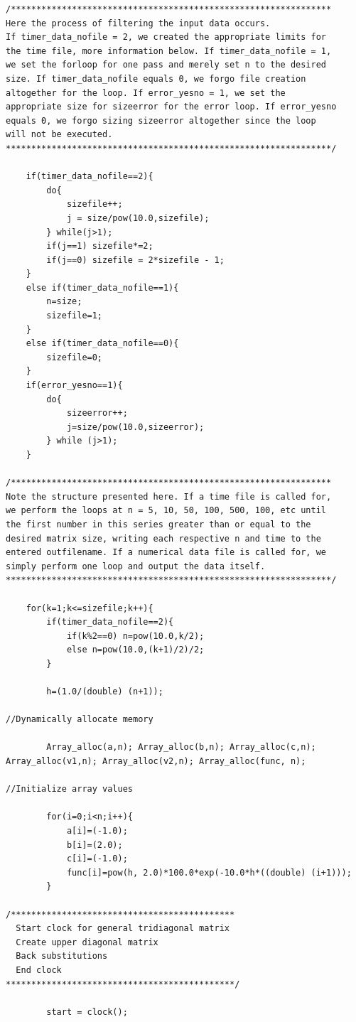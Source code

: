 \documentclass[11pt,a4paper]{article}
\begin{document}
\begin{lstlisting}[title={tridiag.cpp}]
/***************************************************************
Here the process of filtering the input data occurs.
If timer_data_nofile = 2, we created the appropriate limits for
the time file, more information below. If timer_data_nofile = 1, 
we set the forloop for one pass and merely set n to the desired 
size. If timer_data_nofile equals 0, we forgo file creation 
altogether for the loop. If error_yesno = 1, we set the 
appropriate size for sizeerror for the error loop. If error_yesno
equals 0, we forgo sizing sizeerror altogether since the loop 
will not be executed.
****************************************************************/
	
	if(timer_data_nofile==2){
		do{
			sizefile++;
			j = size/pow(10.0,sizefile);
		} while(j>1);
		if(j==1) sizefile*=2;
		if(j==0) sizefile = 2*sizefile - 1;
	}
	else if(timer_data_nofile==1){
		n=size;
		sizefile=1;
	}
	else if(timer_data_nofile==0){
		sizefile=0;
	}
	if(error_yesno==1){
		do{
			sizeerror++;
			j=size/pow(10.0,sizeerror);
		} while (j>1);
	}

/***************************************************************
Note the structure presented here. If a time file is called for, 
we perform the loops at n = 5, 10, 50, 100, 500, 100, etc until 
the first number in this series greater than or equal to the 
desired matrix size, writing each respective n and time to the
entered outfilename. If a numerical data file is called for, we
simply perform one loop and output the data itself.
****************************************************************/

	for(k=1;k<=sizefile;k++){
		if(timer_data_nofile==2){
			if(k%2==0) n=pow(10.0,k/2);
			else n=pow(10.0,(k+1)/2)/2;
		}
	
		h=(1.0/(double) (n+1));

//Dynamically allocate memory
	
		Array_alloc(a,n); Array_alloc(b,n); Array_alloc(c,n); Array_alloc(v1,n); Array_alloc(v2,n); Array_alloc(func, n);

//Initialize array values

		for(i=0;i<n;i++){
			a[i]=(-1.0);
			b[i]=(2.0);
			c[i]=(-1.0);
			func[i]=pow(h, 2.0)*100.0*exp(-10.0*h*((double) (i+1)));
		}

/********************************************
  Start clock for general tridiagonal matrix
  Create upper diagonal matrix
  Back substitutions
  End clock
*********************************************/

		start = clock();
	

\end{lstlisting}
\end{document}
